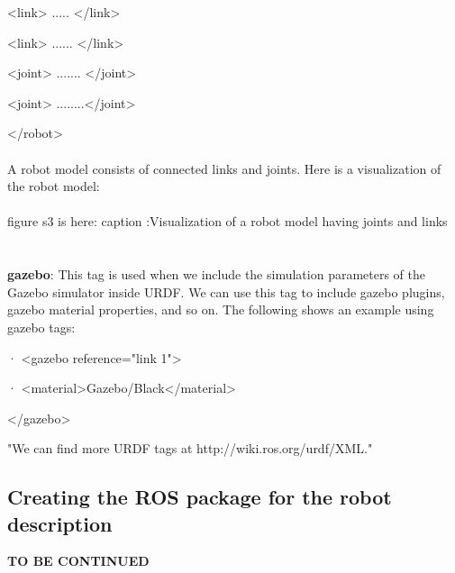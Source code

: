 \documentclass[a4paper]{article}
\begin{document}
  <link>  ..... </link>

  <link> ...... </link>

  <joint> ....... </joint>

  <joint> ........</joint>

</robot>
\\\\A robot model consists of connected links and joints. Here is a visualization of the robot model:
\\\\figure s3 is here: caption :Visualization of a robot model having joints and links \\
 \\\\\textbf{gazebo}: This tag is used when we include the simulation parameters of the Gazebo simulator inside URDF. We can use this tag to include gazebo plugins, gazebo material properties, and so on. The following shows an example using gazebo tags:

·          <gazebo reference="link 1">

·            <material>Gazebo/Black</material>

 </gazebo>

"We can find more URDF tags at http://wiki.ros.org/urdf/XML."
\subsection{Creating the ROS package for the robot description}
\textbf{TO BE CONTINUED}





\end{document}
